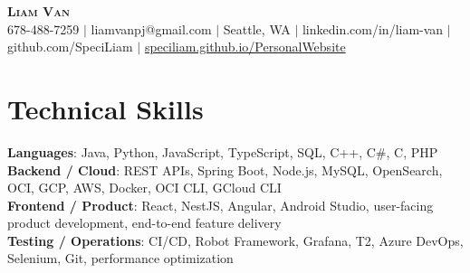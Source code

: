 \documentclass[letterpaper,11pt]{article}
\begin{document}

%
\begin{center}
    \textbf{\Huge \scshape Liam Van} \\ \vspace{1pt}
    \small 678-488-7259 $|$ \small {liamvanpj@gmail.com} $|$ Seattle, WA
 {{$|$ linkedin.com/in/liam-van} {$|$ github.com/SpeciLiam} {$|$ \href{https://speciliam.github.io/PersonalWebsite}{speciliam.github.io/PersonalWebsite}}}

\end{center}

\section{Technical Skills}
 \begin{itemize}[leftmargin=0.15in, label={}]
    \small{\item{
     \textbf{Languages}{: Java, Python, JavaScript, TypeScript, SQL, C++, C\#, C, PHP} \\
     \textbf{Backend / Cloud}{: REST APIs, Spring Boot, Node.js, MySQL, OpenSearch, OCI, GCP, AWS, Docker, OCI CLI, GCloud CLI} \\
     \textbf{Frontend / Product}{: React, NestJS, Angular, Android Studio, user-facing product development, end-to-end feature delivery} \\
     \textbf{Testing / Operations}{: CI/CD, Robot Framework, Grafana, T2, Azure DevOps, Selenium, Git, performance optimization} \\
    }}
 \end{itemize}
%
\end{document}
